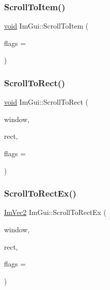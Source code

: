 \mbox{\label{namespaceImGui_ab8548752fba9a4fb91a10574e4857da2}} 
\subsubsection{\texorpdfstring{Scroll\+To\+Item()}{ScrollToItem()}}
{\footnotesize\ttfamily \hyperlink{imgui__impl__opengl3__loader_8h_ac668e7cffd9e2e9cfee428b9b2f34fa7}{void} Im\+Gui\+::\+Scroll\+To\+Item (\begin{DoxyParamCaption}\item[{\hyperlink{imgui__internal_8h_a3c23ec9366e4bede0fedb065a79dcbc1}{Im\+Gui\+Scroll\+Flags}}]{flags = {} }\end{DoxyParamCaption})}

\mbox{\label{namespaceImGui_a980dbb73c1e2a1c349b99ab56bca06d9}} 
\subsubsection{\texorpdfstring{Scroll\+To\+Rect()}{ScrollToRect()}}
{\footnotesize\ttfamily \hyperlink{imgui__impl__opengl3__loader_8h_ac668e7cffd9e2e9cfee428b9b2f34fa7}{void} Im\+Gui\+::\+Scroll\+To\+Rect (\begin{DoxyParamCaption}\item[{\hyperlink{structImGuiWindow}{Im\+Gui\+Window} $\ast$}]{window,  }\item[{const \hyperlink{structImRect}{Im\+Rect} \&}]{rect,  }\item[{\hyperlink{imgui__internal_8h_a3c23ec9366e4bede0fedb065a79dcbc1}{Im\+Gui\+Scroll\+Flags}}]{flags = {} }\end{DoxyParamCaption})}

\mbox{\label{namespaceImGui_a0c9e3a1d81ef0a0c530311beb1d88f7f}} 
\subsubsection{\texorpdfstring{Scroll\+To\+Rect\+Ex()}{ScrollToRectEx()}}
{\footnotesize\ttfamily \hyperlink{structImVec2}{Im\+Vec2} Im\+Gui\+::\+Scroll\+To\+Rect\+Ex (\begin{DoxyParamCaption}\item[{\hyperlink{structImGuiWindow}{Im\+Gui\+Window} $\ast$}]{window,  }\item[{const \hyperlink{structImRect}{Im\+Rect} \&}]{rect,  }\item[{\hyperlink{imgui__internal_8h_a3c23ec9366e4bede0fedb065a79dcbc1}{Im\+Gui\+Scroll\+Flags}}]{flags = {} }\end{DoxyParamCaption})}

